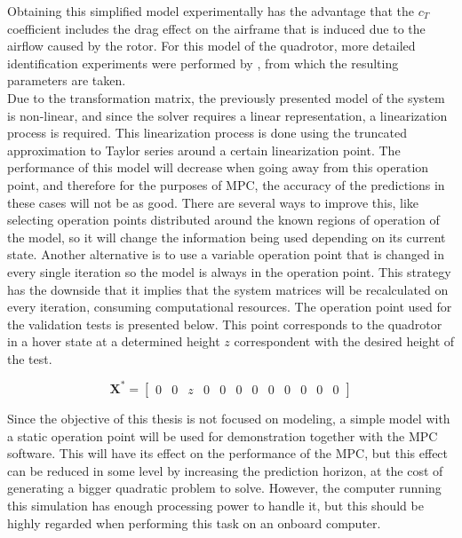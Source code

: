 Obtaining this simplified model experimentally has the advantage that the $c_T$ coefficient includes the drag effect on the airframe that is induced due to the airflow caused by the rotor. For this model of the quadrotor, more detailed identification experiments were performed by \cite{YueSun2012}, from which the resulting parameters are taken. \\

Due to the transformation matrix, the previously presented model of the system is non-linear, and since the solver requires a linear representation, a linearization process is required. This linearization process is done using the truncated approximation to Taylor series around a certain linearization point. The performance of this model will decrease when going away from this operation point, and therefore for the purposes of MPC, the accuracy of the predictions in these cases will not be as good. There are several ways to improve this, like selecting operation points distributed around the known regions of operation of the model, so it will change the information being used depending on its current state. Another alternative is to use a variable operation point that is changed in every single iteration so the model is always in the operation point. This strategy has the downside that it implies that the system matrices will be recalculated on every iteration, consuming computational resources. The operation point used for the validation tests is presented below. This point corresponds to the quadrotor in a hover state at a determined height $z$ correspondent with the desired height of the test. 

\begin{equation*} \label{eq:operationpoint}
\mathbf{X}^* = \begin{bmatrix} 0 & 0 & z & 0 & 0 & 0 & 0 & 0 & 0 & 0 & 0 & 0 \end{bmatrix}
\end{equation*} 

Since the objective of this thesis is not focused on modeling, a simple model with a static operation point will be used for demonstration together with the MPC software. This will have its effect on the performance of the MPC, but this effect can be reduced in some level by increasing the prediction horizon, at the cost of generating a bigger quadratic problem to solve. However, the computer running this simulation has enough processing power to handle it, but this should be highly regarded when performing this task on an onboard computer.

